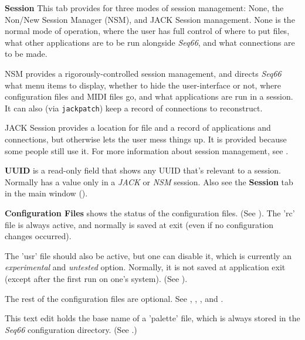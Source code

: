    \textbf{Session}
   This tab provides for three modes of session management:  None, the
   Non/New Session Manager (NSM), and JACK Session management.
   None is the normal mode of operation, where the user has full control of
   where to put files, what other applications are to be run alongside
   \textsl{Seq66}, and what connections are to be made.

   NSM provides a rigorously-controlled session management, and directs
   \textsl{Seq66} what menu items to display, whether to hide the
   user-interface or not, where configuration files and MIDI files go, and what
   applications are run in a session. It can also (via \texttt{jackpatch}) keep
   a record of connections to reconstruct.

   JACK Session provides a location for file and a record of applications and
   connections, but otherwise lets the user mess things up.  It is
   provided because some people still use it.
   For more information about session management, see
   .

   \textbf{UUID} is a read-only field that shows any UUID that's relevant to a
   session. Normally has a value only in a \textsl{JACK} or
   \textsl{NSM} session.
   Also see the \textbf{Session} tab in the main window
   ().

   \textbf{Configuration Files}
   shows the status of the configuration files.
   (See ).
   The 'rc' file is always active, and normally is saved at exit (even if no
   configuration changes occurred).

   The 'usr' file should also be active, but one can disable it, which is
   currently an \textsl{experimental} and \textsl{untested} option.
   Normally, it is not saved at application exit (except after the first run on
   one's system).
   (See ).

   The rest of the configuration files are optional.
   See
   ,
   ,
   , and
   .

   This text edit holds the base name of a 'palette' file, which is always
   stored in the \textsl{Seq66} configuration directory.
   (See .)


